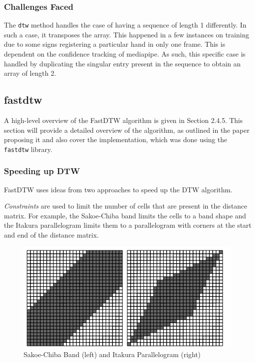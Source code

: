\documentclass[final,rdr32.tex]{subfiles}
\begin{document}
\subsubsection{Challenges Faced}

The \verb|dtw| method handles the case of having a sequence of length 1 differently. In such a case, it transposes the array. This happened in a few instances on training due to some signs registering a particular hand in only one frame. This is dependent on the confidence tracking of mediapipe. As such, this specific case is handled by duplicating the singular entry present in the sequence to obtain an array of length 2.

\subsection{fastdtw}
\label{sec:fastdtw}
A high-level overview of the FastDTW algorithm is given in Section 2.4.5. This section will provide a detailed overview of the algorithm, as outlined in the paper proposing it \cite{salvador2007toward} and also cover the implementation, which was done using the \verb|fastdtw| library.

\subsubsection{Speeding up DTW}

FastDTW uses ideas from two approaches to speed up the DTW algorithm.

\textit{Constraints} are used to limit the number of cells that are present in the distance matrix. For example, the Sakoe-Chiba band \cite{sakoe1978dynamic} limits the cells to a band shape and the Itakura parallelogram \cite{itakura1975minimum} limits them to a parallelogram with corners at the start and end of the distance matrix.

\begin{figure}[H]
    \begin{center}
        \includegraphics[scale=1]{images/constraint.png}
        \caption{Sakoe-Chiba Band (left) and Itakura Parallelogram (right)}
    \end{center}
\end{figure}
\end{document}

